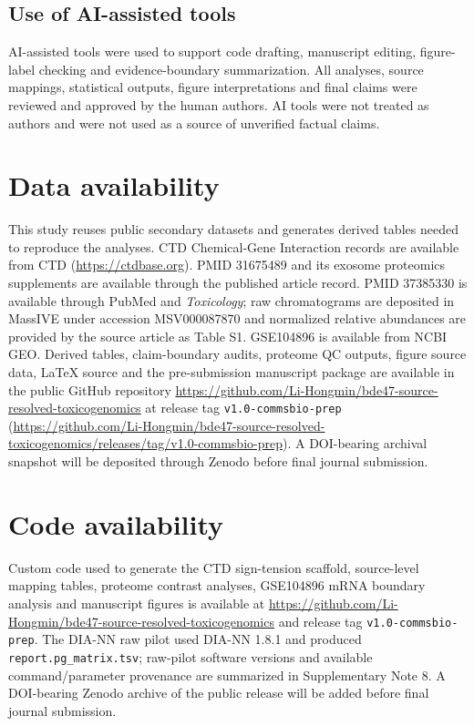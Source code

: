 \documentclass[11pt]{article}
\begin{document}
\subsection{Use of AI-assisted tools}
AI-assisted tools were used to support code drafting, manuscript editing, figure-label checking and evidence-boundary summarization. All analyses, source mappings, statistical outputs, figure interpretations and final claims were reviewed and approved by the human authors. AI tools were not treated as authors and were not used as a source of unverified factual claims.

\section{Data availability}
This study reuses public secondary datasets and generates derived tables needed to reproduce the analyses. CTD Chemical-Gene Interaction records are available from CTD (\url{https://ctdbase.org}). PMID 31675489 and its exosome proteomics supplements are available through the published article record. PMID 37385330 is available through PubMed and \emph{Toxicology}; raw chromatograms are deposited in MassIVE under accession MSV000087870 and normalized relative abundances are provided by the source article as Table S1. GSE104896 is available from NCBI GEO. Derived tables, claim-boundary audits, proteome QC outputs, figure source data, LaTeX source and the pre-submission manuscript package are available in the public GitHub repository \url{https://github.com/Li-Hongmin/bde47-source-resolved-toxicogenomics} at release tag \texttt{v1.0-commsbio-prep} (\url{https://github.com/Li-Hongmin/bde47-source-resolved-toxicogenomics/releases/tag/v1.0-commsbio-prep}). A DOI-bearing archival snapshot will be deposited through Zenodo before final journal submission.

\section{Code availability}
Custom code used to generate the CTD sign-tension scaffold, source-level mapping tables, proteome contrast analyses, GSE104896 mRNA boundary analysis and manuscript figures is available at \url{https://github.com/Li-Hongmin/bde47-source-resolved-toxicogenomics} and release tag \texttt{v1.0-commsbio-prep}. The DIA-NN raw pilot used DIA-NN 1.8.1 and produced \texttt{report.pg\_matrix.tsv}; raw-pilot software versions and available command/parameter provenance are summarized in Supplementary Note 8. A DOI-bearing Zenodo archive of the public release will be added before final journal submission.
\end{document}
